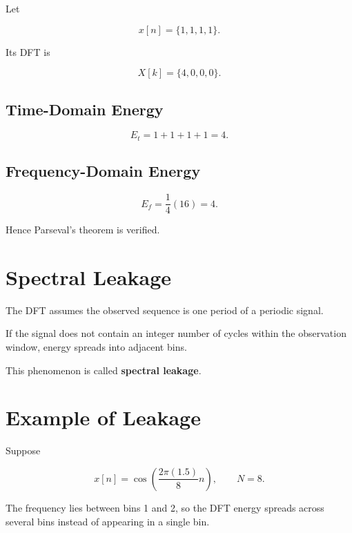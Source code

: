 Let

\[
x[n]=\{1,1,1,1\}.
\]

Its DFT is

\[
X[k]=\{4,0,0,0\}.
\]


\subsection{Time-Domain Energy}

\[
E_t=1+1+1+1=4.
\]


\subsection{Frequency-Domain Energy}

\[
E_f=
\frac{1}{4}(16)=4.
\]

Hence Parseval’s theorem is verified.


\section{Spectral Leakage}

The DFT assumes the observed sequence is one period of a periodic signal.

If the signal does not contain an integer number of cycles within the observation
window, energy spreads into adjacent bins.

This phenomenon is called \textbf{spectral leakage}.


\section{Example of Leakage}

Suppose

\[
x[n]=\cos\left(\frac{2\pi(1.5)}{8}n\right),
\qquad N=8.
\]

The frequency lies between bins 1 and 2, so the DFT energy spreads across several
bins instead of appearing in a single bin.


